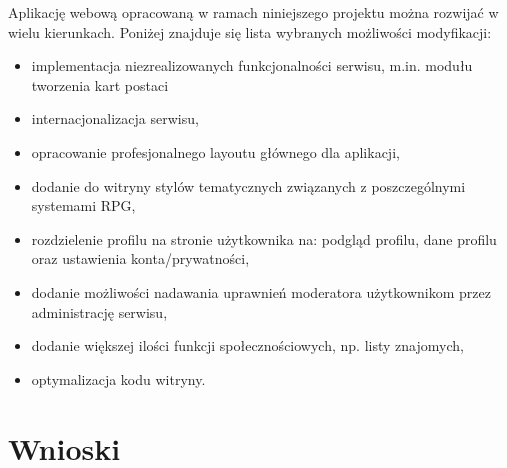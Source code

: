Aplikację webową opracowaną w ramach niniejszego projektu można rozwijać w wielu kierunkach. Poniżej znajduje się lista wybranych możliwości modyfikacji:
\begin{itemize}
\item implementacja niezrealizowanych funkcjonalności serwisu, m.in. modułu tworzenia kart postaci
\item internacjonalizacja serwisu,
\item opracowanie profesjonalnego layoutu głównego dla aplikacji,
\item dodanie do witryny stylów tematycznych związanych z poszczególnymi systemami RPG,
\item rozdzielenie profilu na stronie użytkownika na: podgląd profilu, dane profilu oraz ustawienia konta/prywatności,
\item dodanie możliwości nadawania uprawnień moderatora użytkownikom przez administrację serwisu,
\item dodanie większej ilości funkcji społecznościowych, np. listy znajomych,
\item optymalizacja kodu witryny.
\end{itemize}


\section{Wnioski}
\label{sec:doswiadczenia}

